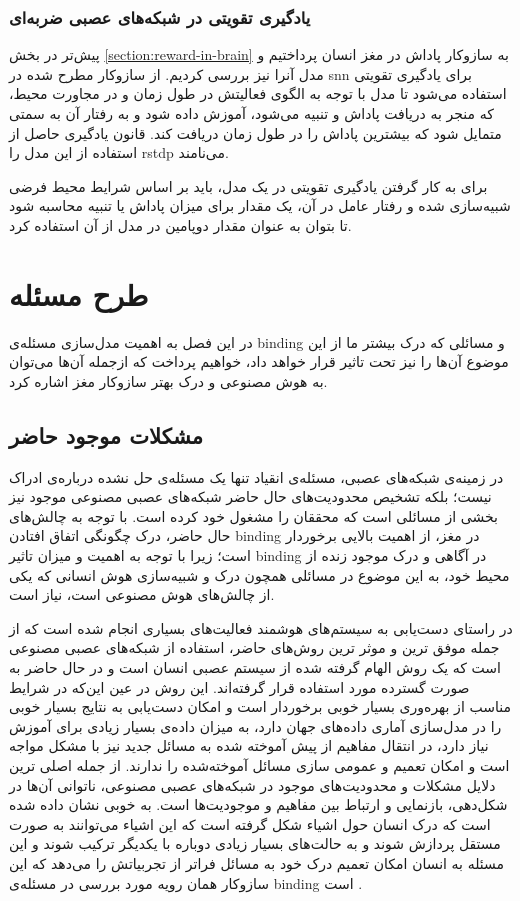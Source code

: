\documentclass[12pt]{report}
\begin{document}
	\subsection{یادگیری تقویتی در شبکه‌های عصبی ضربه‌ای}
	
	پیش‌تر در بخش \ref{section:reward-in-brain} به سازوکار پاداش در مغز انسان پرداختیم و مدل آنرا نیز بررسی کردیم. از سازوکار مطرح شده در \gls{snn} برای یادگیری تقویتی استفاده می‌شود تا مدل با توجه به الگوی فعالیتش در طول زمان و در مجاورت محیط، که منجر به دریافت پاداش و تنبیه می‌شود، آموزش داده شود و به رفتار آن به سمتی متمایل شود که بیشترین پاداش را در طول زمان دریافت کند. قانون یادگیری حاصل از استفاده از این مدل را \gls{rstdp} می‌نامند.
	
	برای به کار گرفتن یادگیری تقویتی در یک مدل، باید بر اساس شرایط محیط فرضی شبیه‌سازی شده و رفتار عامل در آن، یک مقدار برای میزان پاداش یا تنبیه محاسبه شود تا بتوان به عنوان مقدار دوپامین در مدل از آن استفاده کرد.
 	
	
	\chapter{طرح مسئله}
	
	در این فصل به اهمیت مدل‌سازی مسئله‌ی \gls{binding} و مسائلی که درک بیشتر ما از این موضوع آن‌ها را نیز تحت تاثیر قرار خواهد داد، خواهیم پرداخت که از‌جمله آن‌ها می‌توان به هوش مصنوعی و درک بهتر ساز‌وکار مغز اشاره کرد.
	
	\section{مشکلات موجود حاضر}
	در زمینه‌ی شبکه‌های عصبی، مسئله‌ی انقیاد تنها یک مسئله‌ی حل نشده درباره‌ی ادراک نیست؛ بلکه تشخیص محدودیت‌های حال حاضر شبکه‌های عصبی مصنوعی موجود نیز بخشی از مسائلی است که محققان را مشغول خود کرده است.
	با توجه به چالش‌های حال حاضر، درک چگونگی اتفاق افتادن \gls{binding} در مغز، از اهمیت بالایی برخوردار است؛ زیرا با توجه به اهمیت و میزان تاثیر \gls{binding} در آگاهی و درک موجود زنده از محیط خود، به این موضوع در مسائلی همچون درک و شبیه‌سازی هوش انسانی که یکی از چالش‌های هوش مصنوعی است، نیاز است.
	
	در راستای دست‌یابی به سیستم‌های هوشمند فعالیت‌های بسیاری انجام شده است که از جمله‌ موفق ترین و موثر ترین روش‌های حاضر، استفاده از شبکه‌های عصبی مصنوعی است که یک روش الهام گرفته شده از سیستم عصبی انسان است و در حال حاضر به صورت گسترده مورد استفاده قرار گرفته‌اند. این روش در  عین این‌که در شرایط مناسب از بهره‌وری بسیار خوبی برخوردار است و امکان دست‌یابی به نتایج بسیار خوبی را در مدل‌سازی آماری داده‌های جهان دارد، به میزان داده‌ی بسیار زیادی برای آموزش نیاز دارد، در انتقال مفاهیم از پیش آموخته شده به مسائل جدید نیز با مشکل مواجه است و امکان تعمیم و عمومی سازی مسائل آموخته‌شده را ندارند.
	از جمله اصلی ترین دلایل مشکلات و محدودیت‌های موجود در شبکه‌های عصبی مصنوعی، ناتوانی آن‌ها در شکل‌دهی، بازنمایی و ارتباط بین مفاهیم و موجودیت‌ها است. به خوبی نشان داده شده است که درک انسان حول اشیاء شکل گرفته است که این اشیاء می‌توانند به صورت مستقل پردازش شوند و به حالت‌های بسیار زیادی دوباره با یکدیگر ترکیب شوند و این مسئله به انسان امکان تعمیم درک خود به مسائل فراتر از تجربیاتش را می‌دهد که این ساز‌وکار همان رویه مورد بررسی در مسئله‌ی \gls{binding} است
	\cite{greff2020binding}.
	
\end{document}
